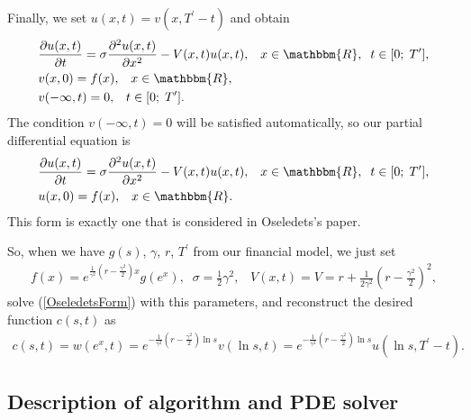\documentclass[11pt,a4paper]{extarticle}
\begin{document}
Finally, we set $u(x,t) = v(x, T^{\prime}-t)$ and obtain
\begin{equation}
	\begin{aligned}
		&\frac{\partial u(x,t)}{\partial t} = \sigma \frac{\partial^2 u(x,t)}{\partial x^2} - V(x,t) u(x,t),
		\;\;\;x \in \mathbbm{R},\;\; t \in [0;\;T^{\prime}],\\
		&v(x,0) = f(x), \;\;\; x \in \mathbbm{R},\\
		&v(-\infty,t) = 0, \;\;\; t \in [0;\;T^{\prime}].
	\end{aligned}
\end{equation}
The condition $v(-\infty,t) = 0$ will be satisfied automatically, so our partial differential equation is
\begin{equation}
	\begin{aligned}
		&\frac{\partial u(x,t)}{\partial t} = \sigma \frac{\partial^2 u(x,t)}{\partial x^2} - V(x,t) u(x,t),
		\;\;\;x \in \mathbbm{R},\;\; t \in [0;\;T^{\prime}],\\
		&u(x,0) = f(x), \;\;\; x \in \mathbbm{R}.
	\label{OseledetsForm}
	\end{aligned}
\end{equation}
This form is exactly one that is considered in Oseledets's paper.

So, when we have $g(s)$, $\gamma$, $r$, $T^{\prime}$ from our financial model, we just set
\begin{equation}
	\begin{aligned}
		f(x) = e^{\frac{1}{\gamma^2} (r-\frac{\gamma^2}{2})x} g(e^x), \;\; \sigma = \frac12 \gamma^2, \;\;\; V(x,t) = V = r +  \frac{1}{2\gamma^2} \left( r-\frac{\gamma^2}{2}\right)^2,
	\end{aligned}
\end{equation}
solve (\ref{OseledetsForm}) with this parameters, and reconstruct the desired function $c(s,t)$ as
\begin{equation}
	\begin{aligned}
		c(s,t) = w(e^x, t) = e^{-\frac{1}{\gamma^2} (r-\frac{\gamma^2}{2})\ln s} v(\ln s, t) = e^{-\frac{1}{\gamma^2} (r-\frac{\gamma^2}{2})\ln s} u(\ln s, T^{\prime} - t).
	\end{aligned}
\end{equation}

\subsection{Description of algorithm and PDE solver}
\end{document}
